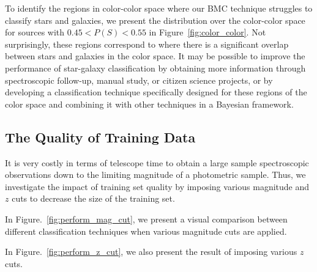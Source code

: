 \documentclass[useAMS,usenatbib]{mn2e}
\begin{document}
To identify the regions in color-color space
where our BMC technique struggles to classify stars and galaxies,
we present the distribution over the color-color space for sources with
$0.45 < P(S) < 0.55$ in Figure~\ref{fig:color_color}.
Not surprisingly, these regions correspond to
where there is a significant overlap between stars and galaxies
in the color space.
It may be possible to improve the performance of
star-galaxy classification by obtaining more information
through spectroscopic follow-up, manual study, or citizen science projects,
or by developing a classification technique specifically designed
for these regions of the color space and
combining it with other techniques in a Bayesian framework.

\subsection{The Quality of Training Data}
  \label{section:quality_training}

It is very costly in terms of telescope time to
obtain a large sample spectroscopic observations
down to the limiting magnitude of a photometric sample.
Thus, we investigate the impact of training set quality
by imposing various magnitude and $z$ cuts
to decrease the size of the training set.

In Figure.~\ref{fig:perform_mag_cut}, we present
a visual comparison between different classification techniques
when various magnitude cuts are applied.

In Figure.~\ref{fig:perform_z_cut}, we also present
the result of imposing various $z$ cuts.
\end{document}
